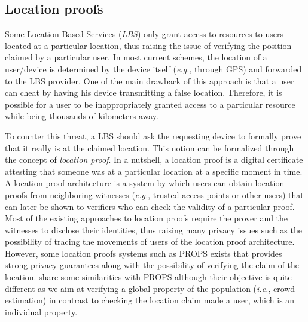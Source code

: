 \subsection{Location proofs}

Some Location-Based Services (\emph{LBS}) only grant access to resources to users located at a particular location,  thus raising the issue of verifying the position claimed by a particular user. 
In most current schemes, the location of a user/device is determined by the device itself (\emph{e.g.}, through GPS) and forwarded to the LBS provider. 
One of the main drawback of this approach is that a user can cheat by having his device transmitting a false location. 
Therefore, it is possible for a user to be inappropriately granted access to a particular resource while being thousands of kilometers away.

To counter this threat, a LBS should ask the requesting device to formally prove that it really is at the claimed location. This notion can be formalized through the concept of \emph{location proof}. 
In a nutshell, a location proof is a digital certificate attesting that someone was at a particular location at a specific moment in time. A location proof architecture is a system by which users can obtain location proofs from neighboring witnesses (\emph{e.g.}, trusted access points or other users) that can later be shown to verifiers who can check the validity of a particular proof. 
Most of the existing approaches to location proofs require the prover and the witnesses to disclose their identities, thus raising many privacy issues such as the possibility of tracing the movements of users of the location proof architecture.
However, some location proofs systems such as PROPS exists that provides strong privacy guarantees along with the possibility of verifying the claim of the location. 
\PRIVO share some similarities with PROPS although their objective is quite different as we aim at verifying a global property of the population (\emph{i.e.}, crowd estimation) in contrast to checking the location claim made a user, which is an individual property. 
